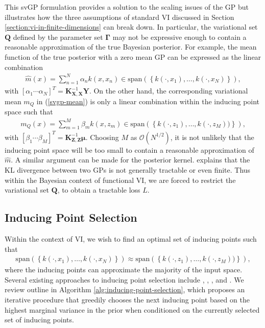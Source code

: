 \documentclass{article}
\numberwithin{equation}{section}
\begin{document}
This svGP formulation provides a solution to the scaling issues of the GP but illustrates how the three assumptions of standard VI discussed in Section \ref{section:vi-in-finite-dimensions} can break down.
In particular, the variational set $\mathbf{Q}$ defined by the parameter set $\boldsymbol{\Gamma}$ may not be expressive enough to contain a reasonable approximation of the true Bayesian posterior.
For example, the mean function of the true posterior with a zero mean GP can be expressed as the linear combination
\begin{align}
    \hat{m}(x) = \sum_{n=1}^{N} \alpha_n k(x, x_n) \in \text{span} \left(\left\{k(\cdot, x_1), \dots, k(\cdot, x_N)\right\}\right),
\end{align}
with $\left[\alpha_1 \cdots \alpha_N\right]^T = \mathbf{K}_{\mathbf{X}, \mathbf{X}}^{-1}\mathbf{Y}$.
On the other hand, the corresponding variational mean $m_Q$ in (\ref{svgp-mean}) is only a linear combination within the inducing point space such that
\begin{align}
    m_Q(x) = \sum_{m=1}^{M} \beta_m k(x, z_m) \in \text{span}\left(\left\{k(\cdot, z_1), \dots, k(\cdot, z_M))\right\}\right),
\end{align}
with $\left[\beta_1 \cdots \beta_M\right]^T = \mathbf{K}_{\mathbf{Z}, \mathbf{Z}}^{-1}\boldsymbol{\mu}$.
Choosing $M$ as $\mathcal{O}(N^{1/2})$, it is not unlikely that the inducing point space will be too small to contain a reasonable approximation of $\hat{m}$.
A similar argument can be made for the posterior kernel.
\cite{burt2020understanding} explains that the KL divergence between two GPs is not generally tractable or even finite.
Thus within the Bayesian context of functional VI, we are forced to restrict the variational set $\boldsymbol{Q}$, to obtain a tractable loss $L$.

\subsection{Inducing Point Selection}\label{section:inducing-point-selection}
Within the context of VI, we wish to find an optimal set of inducing points such that
\begin{align}
    \text{span} \left(\left\{k(\cdot, x_1), \dots, k(\cdot, x_N)\right\}\right) \approx \text{span}\left(\left\{k(\cdot, z_1), \dots, k(\cdot, z_M))\right\}\right),
    \label{inducing-point-input-space}
\end{align}
where the inducing points can approximate the majority of the input space. 
Several existing approaches to inducing point selection include \cite{smola2000sparse}, \cite{hensman2015scalable}, \cite{li2016fast}, and \cite{alaoui2015fast}.
We review \cite{burt2020convergence} outline in Algorithm \ref{alg:inducing-point-selection}, which proposes an iterative procedure that greedily chooses the next inducing point based on the highest marginal variance in the prior when conditioned on the currently selected set of inducing points.
\end{document}
